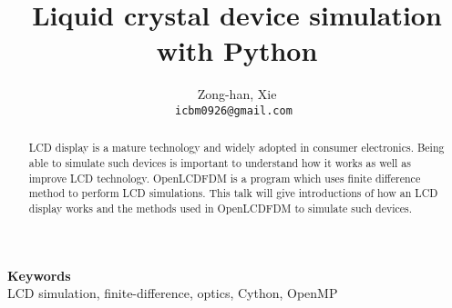 \documentclass[11pt, a4paper]{article} %
\date{} %
\def\keywords#1{\begin{center}{\bf Keywords}\\{#1}\end{center}}
\def\titulo#1{\title{#1}} %
\def\autores#1{\author{#1}} %
\begin{document}
\titulo{Liquid crystal device simulation with Python}

\autores{Zong-han, Xie \\
       \tt{icbm0926@gmail.com}
       }

\maketitle

\thispagestyle{empty}



\begin{abstract}
LCD display is a mature technology and widely adopted in consumer electronics. Being able to simulate such devices is important to understand how it works as well as improve LCD technology. OpenLCDFDM is a program which uses finite difference method to perform LCD simulations. This talk will give introductions of how an LCD display works and the methods used in OpenLCDFDM to simulate such devices.
\end{abstract}

\keywords{LCD simulation, finite-difference, optics, Cython, OpenMP} %
\end{document}
